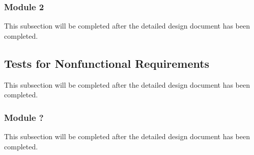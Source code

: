 \documentclass[12pt, titlepage]{article}
\begin{document}
\subsubsection{Module 2}
This subsection will be completed after the detailed design document has been completed.


\subsection{Tests for Nonfunctional Requirements}
This subsection will be completed after the detailed design document has been completed.





\subsubsection{Module ?}
This subsection will be completed after the detailed design document has been completed.


		


					
					
					
					
					

					
					
					
					
\end{document}
